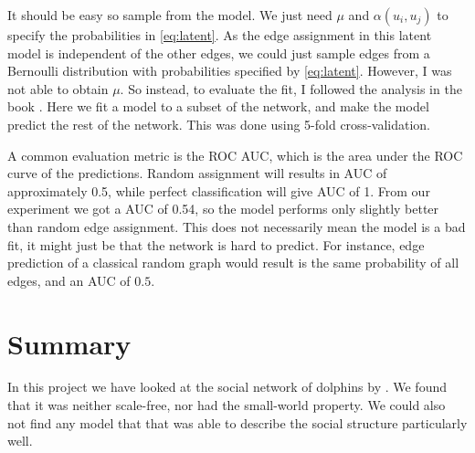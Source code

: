 \documentclass[11pt,a4paper]{article}
\begin{document}
It should be easy so sample from the model. We just need $\mu$ and $\alpha(u_i, u_j)$ to specify the probabilities in \eqref{eq:latent}.  
As the edge assignment in this latent model is independent of the other edges, we could just sample edges from a Bernoulli distribution with probabilities specified by \eqref{eq:latent}. However, I was not able to obtain $\mu$.
So instead, to evaluate the fit, I followed the analysis in the book \cite{kolaczyk2014}. Here we fit a model to a subset of the network, and make the model predict the rest of the network. This was done using 5-fold cross-validation. 

A common evaluation metric is the ROC AUC, which is the area under the ROC curve of the predictions. Random assignment will results in AUC of approximately 0.5, while perfect classification will give AUC of 1. From our experiment we got a AUC of 0.54, so the model performs only slightly better than random edge assignment.
This does not necessarily mean the model is a bad fit, it might just be that the network is hard to predict. For instance, edge prediction of a classical random graph would result is the same probability of all edges, and an AUC of $0.5$.

\section{Summary}
In this project we have looked at the social network of dolphins by \cite{dolphins}. We found that it was neither scale-free, nor had the small-world property. We could also not find any model that that was able to describe the social structure particularly well. 





\cleardoublepage{}
{}
%
%
%
%



%
%
\end{document}
